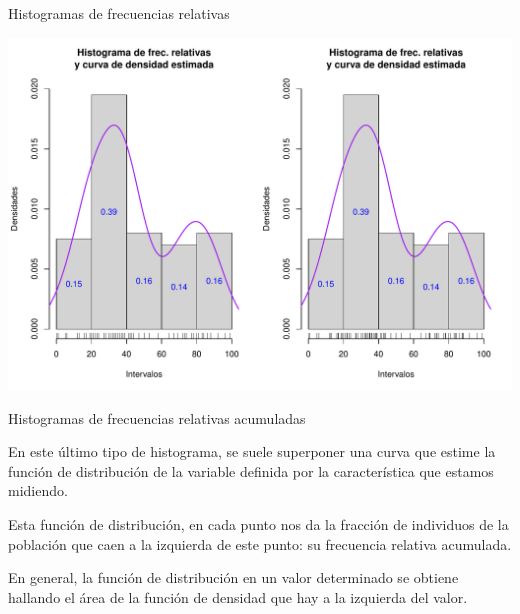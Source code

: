 \documentclass[
  ignorenonframetext,
]{beamer}
\begin{document}
\begin{frame}{Histogramas de frecuencias relativas}
\protect\hypertarget{histogramas-de-frecuencias-relativas-2}{}

\includegraphics{Tema9.-Agrupacion_datos_cuantitativos_files/figure-beamer/unnamed-chunk-49-1.pdf}

\end{frame}

\begin{frame}{Histogramas de frecuencias relativas acumuladas}
\protect\hypertarget{histogramas-de-frecuencias-relativas-acumuladas}{}

En este último tipo de histograma, se suele superponer una curva que
estime la función de distribución de la variable definida por la
característica que estamos midiendo.

Esta función de distribución, en cada punto nos da la fracción de
individuos de la población que caen a la izquierda de este punto: su
frecuencia relativa acumulada.

En general, la función de distribución en un valor determinado se
obtiene hallando el área de la función de densidad que hay a la
izquierda del valor.

\end{frame}
\end{document}
